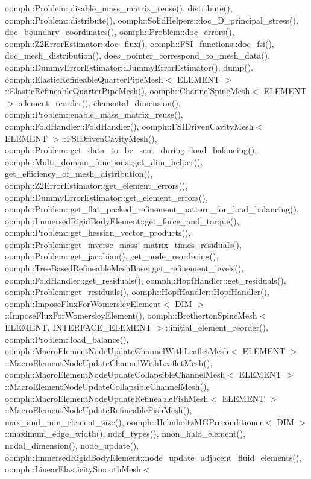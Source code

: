 oomph\+::\+Problem\+::disable\+\_\+mass\+\_\+matrix\+\_\+reuse(), distribute(), oomph\+::\+Problem\+::distribute(), oomph\+::\+Solid\+Helpers\+::doc\+\_\+D\+\_\+principal\+\_\+stress(), doc\+\_\+boundary\+\_\+coordinates(), oomph\+::\+Problem\+::doc\+\_\+errors(), oomph\+::\+Z2\+Error\+Estimator\+::doc\+\_\+flux(), oomph\+::\+F\+S\+I\+\_\+functions\+::doc\+\_\+fsi(), doc\+\_\+mesh\+\_\+distribution(), does\+\_\+pointer\+\_\+correspond\+\_\+to\+\_\+mesh\+\_\+data(), oomph\+::\+Dummy\+Error\+Estimator\+::\+Dummy\+Error\+Estimator(), dump(), oomph\+::\+Elastic\+Refineable\+Quarter\+Pipe\+Mesh$<$ E\+L\+E\+M\+E\+N\+T $>$\+::\+Elastic\+Refineable\+Quarter\+Pipe\+Mesh(), oomph\+::\+Channel\+Spine\+Mesh$<$ E\+L\+E\+M\+E\+N\+T $>$\+::element\+\_\+reorder(), elemental\+\_\+dimension(), oomph\+::\+Problem\+::enable\+\_\+mass\+\_\+matrix\+\_\+reuse(), oomph\+::\+Fold\+Handler\+::\+Fold\+Handler(), oomph\+::\+F\+S\+I\+Driven\+Cavity\+Mesh$<$ E\+L\+E\+M\+E\+N\+T $>$\+::\+F\+S\+I\+Driven\+Cavity\+Mesh(), oomph\+::\+Problem\+::get\+\_\+data\+\_\+to\+\_\+be\+\_\+sent\+\_\+during\+\_\+load\+\_\+balancing(), oomph\+::\+Multi\+\_\+domain\+\_\+functions\+::get\+\_\+dim\+\_\+helper(), get\+\_\+efficiency\+\_\+of\+\_\+mesh\+\_\+distribution(), oomph\+::\+Z2\+Error\+Estimator\+::get\+\_\+element\+\_\+errors(), oomph\+::\+Dummy\+Error\+Estimator\+::get\+\_\+element\+\_\+errors(), oomph\+::\+Problem\+::get\+\_\+flat\+\_\+packed\+\_\+refinement\+\_\+pattern\+\_\+for\+\_\+load\+\_\+balancing(), oomph\+::\+Immersed\+Rigid\+Body\+Element\+::get\+\_\+force\+\_\+and\+\_\+torque(), oomph\+::\+Problem\+::get\+\_\+hessian\+\_\+vector\+\_\+products(), oomph\+::\+Problem\+::get\+\_\+inverse\+\_\+mass\+\_\+matrix\+\_\+times\+\_\+residuals(), oomph\+::\+Problem\+::get\+\_\+jacobian(), get\+\_\+node\+\_\+reordering(), oomph\+::\+Tree\+Based\+Refineable\+Mesh\+Base\+::get\+\_\+refinement\+\_\+levels(), oomph\+::\+Fold\+Handler\+::get\+\_\+residuals(), oomph\+::\+Hopf\+Handler\+::get\+\_\+residuals(), oomph\+::\+Problem\+::get\+\_\+residuals(), oomph\+::\+Hopf\+Handler\+::\+Hopf\+Handler(), oomph\+::\+Impose\+Flux\+For\+Womersley\+Element$<$ D\+I\+M $>$\+::\+Impose\+Flux\+For\+Womersley\+Element(), oomph\+::\+Bretherton\+Spine\+Mesh$<$ E\+L\+E\+M\+E\+N\+T, I\+N\+T\+E\+R\+F\+A\+C\+E\+\_\+\+E\+L\+E\+M\+E\+N\+T $>$\+::initial\+\_\+element\+\_\+reorder(), oomph\+::\+Problem\+::load\+\_\+balance(), oomph\+::\+Macro\+Element\+Node\+Update\+Channel\+With\+Leaflet\+Mesh$<$ E\+L\+E\+M\+E\+N\+T $>$\+::\+Macro\+Element\+Node\+Update\+Channel\+With\+Leaflet\+Mesh(), oomph\+::\+Macro\+Element\+Node\+Update\+Collapsible\+Channel\+Mesh$<$ E\+L\+E\+M\+E\+N\+T $>$\+::\+Macro\+Element\+Node\+Update\+Collapsible\+Channel\+Mesh(), oomph\+::\+Macro\+Element\+Node\+Update\+Refineable\+Fish\+Mesh$<$ E\+L\+E\+M\+E\+N\+T $>$\+::\+Macro\+Element\+Node\+Update\+Refineable\+Fish\+Mesh(), max\+\_\+and\+\_\+min\+\_\+element\+\_\+size(), oomph\+::\+Helmholtz\+M\+G\+Preconditioner$<$ D\+I\+M $>$\+::maximum\+\_\+edge\+\_\+width(), ndof\+\_\+types(), nnon\+\_\+halo\+\_\+element(), nodal\+\_\+dimension(), node\+\_\+update(), oomph\+::\+Immersed\+Rigid\+Body\+Element\+::node\+\_\+update\+\_\+adjacent\+\_\+fluid\+\_\+elements(), oomph\+::\+Linear\+Elasticity\+Smooth\+Mesh$<$ 